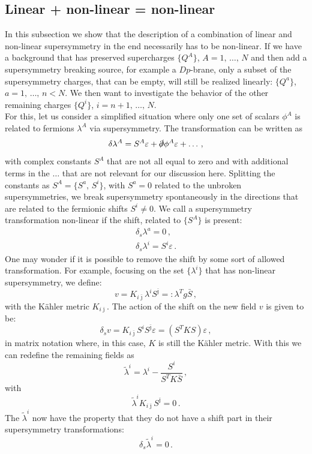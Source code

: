 \documentclass[a4paper,12pt,twoside,openright]{report}
\newcommand{\be}{\begin{equation}}
\newcommand{\ee}{\end{equation}}
\newcommand{\bea}{\begin{equation}\begin{aligned}}
\newcommand{\eea}{\end{aligned}\end{equation}}
\def\jb{{\bar \jmath}}
\begin{document}
\subsection{Linear + non-linear = non-linear}
In this subsection we show that the description of a combination of linear and non-linear supersymmetry in the end necessarily has to be non-linear. If we have a background that has preserved supercharges $\{Q^A\}$, $A =1,\,\ldots,\,N$ and then add a supersymmetry breaking source, for example a $Dp$-brane, only a subset of the supersymmetry charges, that can be empty, will still be realized linearly: $\{Q^a\}$, $a=1,\,\ldots,\,n<N$. We then want to investigate the behavior of the other remaining charges $\{Q^i\}$, $i=n+1,\,\ldots,\,N$.\\
For this, let us consider a simplified situation where only one set of scalars $\phi^A$ is related to fermions $\lambda^A$ via supersymmetry. The transformation can be written as
\be 
\delta \lambda^A = S^A \varepsilon + \slashed{\partial}\phi^A \varepsilon + \ldots\,,
\ee
with complex constants $S^A$ that are not all equal to zero and with additional terms in the $\ldots$ that are not relevant for our discussion here. Splitting the constants as $S^A = \{S^a,\,S^i\}$, with $S^a = 0$ related to the unbroken supersymmetries, we break supersymmetry spontaneously in the directions that are related to the fermionic shifts $S^i\neq0$. We call a supersymmetry transformation non-linear if the shift, related to $\{S^A\}$ is present:
\bea 
\delta_s \lambda^a = 0\,,\\
\delta_s \lambda^i = S^i \varepsilon\,.
\eea
One may wonder if it is possible to remove the shift by some sort of allowed transformation. For example, focusing on the set $\{\lambda^i\}$ that has non-linear supersymmetry, we define:
\be 
v=K_{i\jb}\lambda^iS^\jb =: \lambda^T g \bar{S}\,,
\ee
with the Kähler metric $K_{i\jb}$. The action of the shift on the new field $v$ is given to be:
\be 
\delta_s v = K_{i\jb} S^i S^\jb \varepsilon = \left( S^T K S \right) \varepsilon\,,
\ee
in matrix notation where, in this case, $K$ is still the Kähler metric. With this we can redefine the remaining fields as 
\be 
\tilde{\lambda}^i = \lambda^i - \frac{S^i}{S^T K \bar{S}}\,,
\ee
with 
\be 
\tilde{\lambda}^i K_{i\jb} S^\jb = 0\,.
\ee
The $\tilde{\lambda}^i$ now have the property that they do not have a shift part in their supersymmetry transformations:
\be 
\delta_s \tilde{\lambda}^i = 0\,.
\ee
\end{document}
